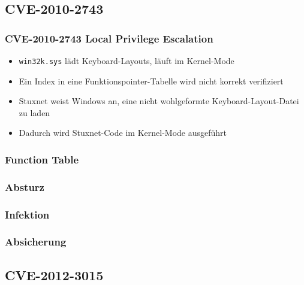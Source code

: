\documentclass{beamer}
\begin{document}
\subsection{CVE-2010-2743}

\begin{frame}
  \frametitle{CVE-2010-2743 Local Privilege Escalation}
  \begin{itemize}
    \item \texttt{win32k.sys} lädt Keyboard-Layouts, läuft im Kernel-Mode
    \item Ein Index in eine Funktionspointer-Tabelle wird nicht korrekt verifiziert
    \item Stuxnet weist Windows an, eine nicht wohlgeformte Keyboard-Layout-Datei zu laden
    \item Dadurch wird Stuxnet-Code im Kernel-Mode ausgeführt
  \end{itemize}
\end{frame}

\begin{frame}
  \frametitle{Function Table}
  
\end{frame}

\begin{frame}
  \frametitle{Absturz}
  
\end{frame}

\begin{frame}
  \frametitle{Infektion}
  
\end{frame}

\begin{frame}
  \frametitle{Absicherung}
  
\end{frame}

\subsection{CVE-2012-3015}
\end{document}
